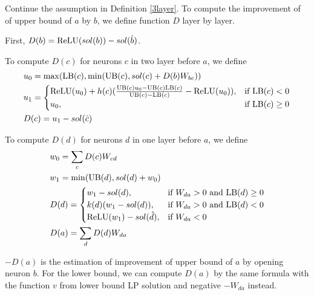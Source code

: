 \begin{definition}
	Continue the assumption in Definition \ref{3layer}. To compute the improvement of of upper bound of $a$ by $b$, we define function $D$ layer by layer.
	
	First, $D(b) = \mathrm{ReLU}(sol(b))-sol(\hat{b})$.
	
To compute $D(c)$ for neurons $c$ in two layer before $a$, we define \begin{align}
	&u_0 = \max(\mathrm{LB}(c),\min(\mathrm{UB}(c),  sol(c)+D(b)W_{bc}))\\
	&u_1 = \begin{cases}
		\mathrm{ReLU}(u_0)+h(c)(\frac{\mathrm{UB}(c)u_0-\mathrm{UB}(c)\mathrm{LB}(c)}{\mathrm{UB}(c)-\mathrm{LB}(c)}-\mathrm{ReLU}(u_0)), & \text{if }\mathrm{LB}(c) < 0\\
	u_0, & \text{if }  \mathrm{LB}(c) \geq 0
	\end{cases}\\
	&D(c) = u_1-sol(\hat{c})
\end{align}
	
	To compute $D(d)$ for neurons $d$ in one layer before $a$, we define 
	\begin{align}
		&w_0 = \sum_c D(c)W_{cd}\\
		&w_1 = \min(\mathrm{UB}(d),sol(d)+w_0)\\		
		&D(d) =
		\begin{cases}
			w_1-sol({d}), & \text{if }W_{da} > 0 \text{ and } \mathrm{LB}(d)\geq 0\\
		k(d)(w_1-sol({d})), & \text{if }W_{da} > 0 \text{ and } \mathrm{LB}(d)< 0\\
		\mathrm{ReLU}(w_1)-sol(\hat{d})	, & \text{if }  W_{da} < 0
		\end{cases}\\
		&D(a) = \sum_d D(d)W_{da}
	\end{align}
\end{definition} $-D(a)$ is the estimation of improvement of upper bound of $a$ by opening neuron $b$.  For the lower bound, we can compute $D(a)$ by the same formula with the function $v$ from lower bound LP solution and negative $-W_{da}$  instead.
		